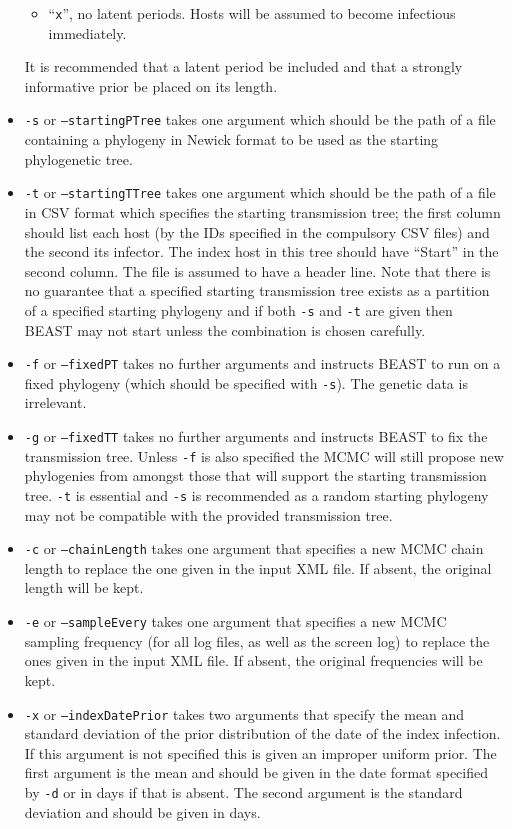 \documentclass[]{article}
\begin{document}
\begin{itemize}
{\begin{itemize}
		\item {``{\tt x}'', no latent periods. Hosts will be assumed to become infectious immediately.}
	\end{itemize}
	It is recommended that a latent period be included and that a strongly informative prior be placed on its length.
} 
\item{{\tt-s} or {\tt --startingPTree} takes one argument which should be the path of a file containing a phylogeny in Newick format to be used as the starting phylogenetic tree.}
\item{{\tt-t} or {\tt --startingTTree} takes one argument which should be the path of a file in CSV format which specifies the starting transmission tree; the first column should list each host (by the IDs specified in the compulsory CSV files) and the second its infector. The index host in this tree should have ``Start'' in the second column. The file is assumed to have a header line. Note that there is no guarantee that a specified starting transmission tree exists as a partition of a specified starting phylogeny and if both {\tt-s} and {\tt-t} are given then BEAST may not start unless the combination is chosen carefully.}
\item{{\tt-f} or {\tt --fixedPT} takes no further arguments and instructs BEAST to run on a fixed phylogeny (which should be specified with {\tt-s}). The genetic data is irrelevant.}
\item{{\tt-g} or {\tt --fixedTT} takes no further arguments and instructs BEAST to fix the transmission tree. Unless {\tt-f} is also specified the MCMC will still propose new phylogenies from amongst those that will support the starting transmission tree. {\tt-t} is essential and {\tt-s} is recommended as a random starting phylogeny may not be compatible with the provided transmission tree.}
\item{{\tt-c} or {\tt --chainLength} takes one argument that specifies a new MCMC chain length to replace the one given in the input XML file. If absent, the original length will be kept.}
\item{{\tt-e} or {\tt --sampleEvery} takes one argument that  specifies a new MCMC sampling frequency (for all log files, as well as the screen log) to replace the ones given in the input XML file. If absent, the original frequencies will be kept.}
\item{{\tt -x} or {\tt --indexDatePrior} takes two arguments that specify the mean and standard deviation of the prior distribution of the date of the index infection. If this argument is not specified this is given an improper uniform prior. The first argument is the mean and should be given in the date format specified by {\tt -d} or in days if that is absent. The second argument is the standard deviation and should be given in days.}
\end{itemize}
\end{document}
